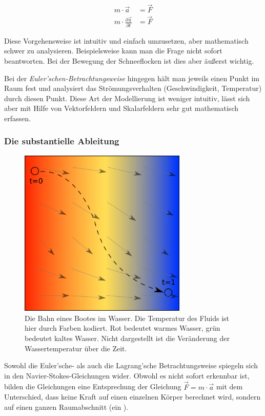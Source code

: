 \begin{align*}
m \cdot \vec{a} &= \vec{F} \\
m \cdot \frac{\partial \vec{u}}{\partial t} &= \vec{F}
\end{align*}

Diese Vorgehensweise ist intuitiv und einfach umzusetzen, aber mathematisch
schwer zu analysieren. Beispielsweise kann man die Frage  nicht sofort
beantworten. Bei der Bewegung der Schneeflocken ist dies aber äußerst
wichtig.

Bei der \emph{Euler'schen-Betrachtungsweise} hingegen hält man jeweils
einen Punkt im Raum fest und analysiert das Strömungsverhalten
(Geschwindigkeit, Temperatur) durch diesen Punkt. Diese Art der
Modellierung ist weniger intuitiv, lässt sich aber mit Hilfe von
Vektorfeldern und Skalarfeldern sehr gut mathematisch erfassen.

\subsubsection{Die substantielle Ableitung}

\begin{figure}[ht]
\centering
\includegraphics[width=8cm]{images/swimmer_in_water}
\caption{Die Bahn eines Bootes im Wasser. Die Temperatur des Fluids ist hier durch Farben kodiert. Rot bedeutet warmes Wasser, grün bedeutet kaltes Wasser. Nicht dargestellt ist die Veränderung der Wassertemperatur über die Zeit.}
\end{figure}

Sowohl die Euler'sche- als auch die Lagrang'sche Betrachtungsweise spiegeln sich
in den Navier-Stokes-Gleichungen wider. Obwohl es nicht sofort
erkennbar ist, bilden die Gleichungen eine Entsprechung der Gleichung
$\vec{F} = m \cdot \vec{a}$ mit dem Unterschied, dass keine Kraft auf
einen einzelnen Körper berechnet wird, sondern auf einen ganzen
Raumabschnitt (ein ).


